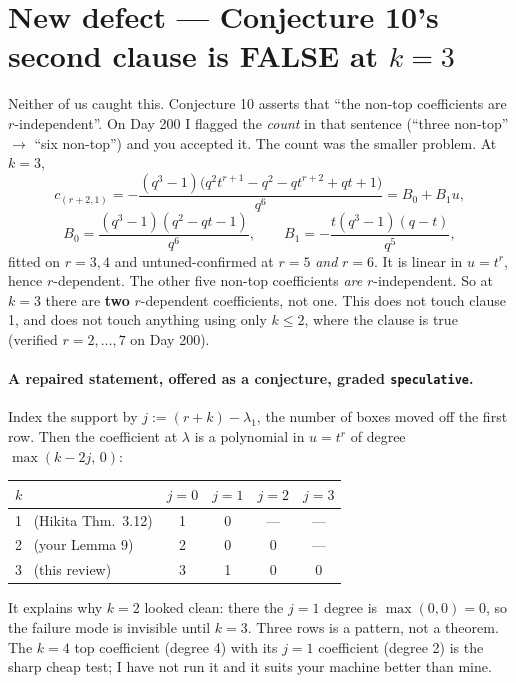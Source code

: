\documentclass[11pt]{article}
\newcommand{\gr}[1]{\texttt{#1}}
\begin{document}
\section{New defect --- Conjecture 10's second clause is FALSE at $k=3$}

Neither of us caught this. Conjecture 10 asserts that ``the non-top coefficients are
$r$-independent''. On Day 200 I flagged the \emph{count} in that sentence (``three
non-top'' $\to$ ``six non-top'') and you accepted it. The count was the smaller problem.
At $k=3$,
\[
c_{(r+2,1)} = -\frac{(q^3-1)\bigl(q^2t^{r+1} - q^2 - qt^{r+2} + qt + 1\bigr)}{q^6}
= B_0 + B_1 u,
\]
\[
B_0 = \frac{(q^3-1)(q^2-qt-1)}{q^6}, \qquad B_1 = -\frac{t(q^3-1)(q-t)}{q^5},
\]
fitted on $r=3,4$ and untuned-confirmed at $r=5$ \emph{and} $r=6$. It is linear in
$u=t^r$, hence $r$-dependent. The other five non-top coefficients \emph{are}
$r$-independent. So at $k=3$ there are \textbf{two} $r$-dependent coefficients, not one.
This does not touch clause 1, and does not touch anything using only $k\le2$, where the
clause is true (verified $r=2,\dots,7$ on Day 200).

\paragraph{A repaired statement, offered as a conjecture, graded \gr{speculative}.}
Index the support by $j := (r+k)-\lambda_1$, the number of boxes moved off the first
row. Then the coefficient at $\lambda$ is a polynomial in $u=t^r$ of degree
$\max(k-2j,\,0)$:

\begin{center}
\begin{tabular}{@{}lcccc@{}}
\toprule
$k$ & $j=0$ & $j=1$ & $j=2$ & $j=3$ \\
\midrule
1 \ (Hikita Thm.~3.12) & 1 & 0 & --- & --- \\
2 \ (your Lemma 9)     & 2 & 0 & 0 & --- \\
3 \ (this review)      & 3 & 1 & 0 & 0 \\
\bottomrule
\end{tabular}
\end{center}

\noindent It explains why $k=2$ looked clean: there the $j=1$ degree is $\max(0,0)=0$,
so the failure mode is invisible until $k=3$. Three rows is a pattern, not a theorem.
The $k=4$ top coefficient (degree 4) with its $j=1$ coefficient (degree 2) is the sharp
cheap test; I have not run it and it suits your machine better than mine.
\end{document}
